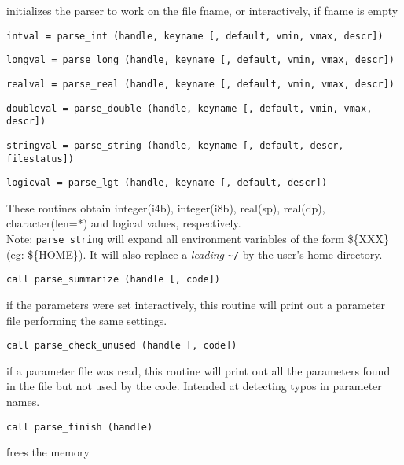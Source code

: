 \quad initializes the parser to work on the file fname, or interactively, if fname is empty

{\tt intval = parse\_int (handle, keyname [, default, vmin, vmax, descr])} 

{\tt longval = parse\_long (handle, keyname [, default, vmin, vmax, descr])} 

{\tt realval = parse\_real (handle, keyname [, default, vmin, vmax, descr])} 

{\tt doubleval = parse\_double (handle, keyname [, default, vmin, vmax, descr])} 

{\tt stringval = parse\_string (handle, keyname [, default, descr, filestatus])} 

{\tt logicval = parse\_lgt (handle, keyname [, default, descr])} 

\quad These routines obtain integer(i4b), integer(i8b), real(sp), real(dp), character(len=*) and logical values,
respectively. \\
Note: {\tt parse\_string} will expand all environment variables of
the form \$\{XXX\} (eg: \$\{HOME\}). It will also replace a {\em leading} 
\verb+~+$\!${\tt /}
by the user's home directory.

{\tt call parse\_summarize (handle [, code])}

\quad if the parameters were set interactively, this routine will print out a 
parameter file performing the same settings.

{\tt call parse\_check\_unused (handle [, code])}

\quad if a parameter file was read, this routine will print out all the parameters
found in the file but not used by the code. Intended at detecting typos in
parameter names.

{\tt call parse\_finish (handle)}

\quad frees the memory

